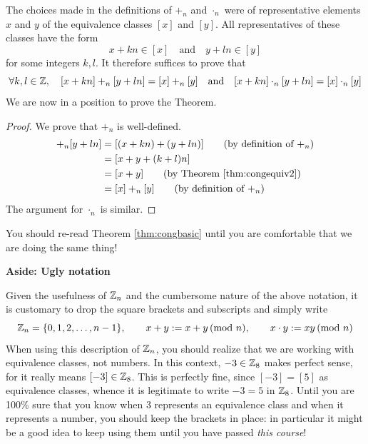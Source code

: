 The choices made in the definitions of $+_n$ and $\cdot_n$ were of representative elements $x$ and $y$ of the equivalence classes $[x]$ and $[y]$. All representatives of these classes have the form
\[
	x+kn\in[x]\quad\text{and}\quad y+ln\in[y]
\]
for some integers $k,l$. It therefore suffices to prove that
\[
	\forall k,l\in\mathbb{Z},\quad [x+kn]+_n[y+ln]=[x]+_n[y]\quad\text{and}\quad [x+kn]\cdot_n[y+ln]=[x]\cdot_n[y]
\]
We are now in a position to prove the Theorem.

\begin{proof}
	We prove that $+_n$ is well-defined.
	\begin{align*}
		[x+kn]+_n[y+ln]&=[(x+kn)+(y+ln)]\tag*{(by definition of $+_n$)}\\
		&=[x+y+(k+l)n]\\
		&=[x+y]\tag*{(by Theorem \ref{thm:congequiv2})}\\
		&=[x]+_n[y]\tag*{(by definition of $+_n$)}
	\end{align*}
	The argument for $\cdot_n$ is similar.
\end{proof}

You should re-read Theorem \ref{thm:congbasic} until you are comfortable that we are doing the same thing!

\begin{aside}{}{}
{\bf Aside: Ugly notation}

Given the usefulness of $\mathbb{Z}_n$ and the cumbersome nature of the above notation, it is customary to drop the square brackets and subscripts and simply write
\[
	\mathbb{Z}_n=\{0,1,2,\ldots,n-1\},\qquad x+y:=x+y\negthickspace\pmod{n},\qquad x\cdot y:=xy\negthickspace\pmod{n}
\]
When using this description of $\mathbb{Z}_n$, you should realize that we are working with equivalence classes, not numbers. In this context, $-3\in\mathbb{Z}_8$ makes perfect sense, for it really means $[-3]\in\mathbb{Z}_8$. This is perfectly fine, since $[-3]=[5]$ as equivalence classes, whence it is legitimate to write $-3=5$ in $\mathbb{Z}_8$. Until you are 100\% sure that you know when 3 represents an equivalence class and when it represents a number, you should keep the brackets in place: in particular it might be a good idea to keep using them until you have passed \emph{this course}!
\end{aside}

% 
% 

